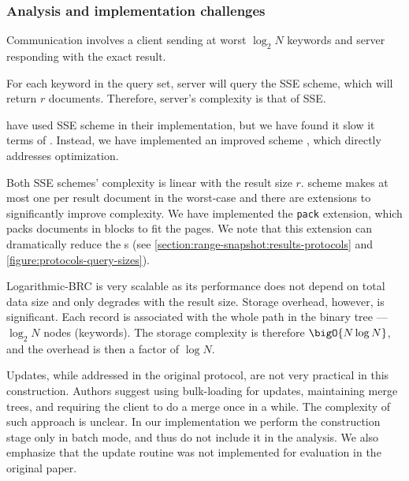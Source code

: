 	\subsubsection{Analysis and implementation challenges}

		Communication involves a client sending at worst $\log_2 N$ keywords and server responding with the exact result.

		For each keyword in the query set, server will query the SSE scheme, which will return $r$ documents.
		Therefore, server's {\IO} complexity is that of SSE\@.

		\textcite{practical-range-search} have used \cite{cjjkrs-13} SSE scheme in their implementation, but we have found it slow it terms of {\IO}.
		Instead, we have implemented an improved scheme \cite{cjjjkrs-14}, which directly addresses {\IO} optimization.

		Both SSE schemes' {\IO} complexity is linear with the result size $r$.
		\cite{cjjjkrs-14} scheme makes at most one {\IO} per result document in the worst-case and there are extensions to significantly improve {\IO} complexity. %
		We have implemented the \texttt{pack} extension, which packs documents in blocks to fit the {\IO} pages.
		We note that this extension can dramatically reduce the {\IO}s (see \cref{section:range-snapshot:results-protocols} and \cref{figure:protocols-query-sizes}).

		Logarithmic\hyp{}BRC is very scalable as its performance does not depend on total data size and only degrades with the result size.
		Storage overhead, however, is significant.
		Each record is associated with the whole path in the binary tree --- $\log_2 N$ nodes (keywords).
		The storage complexity is therefore $\bigO{N \log N}$, and the overhead is then a factor of $\log N$.

		Updates, while addressed in the original protocol, are not very practical in this construction.
		Authors suggest using bulk-loading for updates, maintaining merge trees, and requiring the client to do a merge once in a while.
		The {\IO} complexity of such approach is unclear.
		In our implementation we perform the construction stage only in batch mode, and thus do not include it in the analysis.
		We also emphasize that the update routine was not implemented for evaluation in the original paper.
